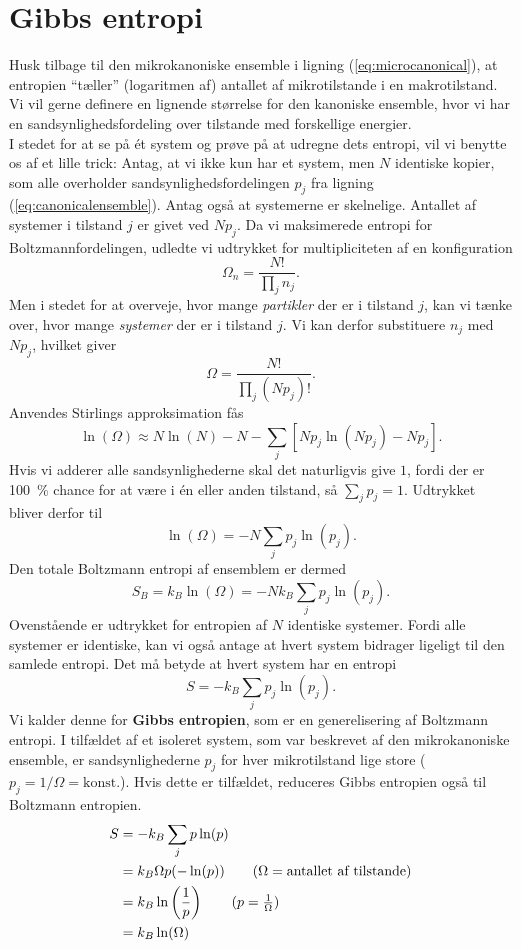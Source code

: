 \section{Gibbs entropi}
Husk tilbage til den mikrokanoniske ensemble i ligning (\ref{eq:microcanonical}), at entropien ``tæller'' (logaritmen af) antallet af mikrotilstande i en makrotilstand. Vi vil gerne definere en lignende størrelse for den kanoniske ensemble, hvor vi har en sandsynlighedsfordeling over tilstande med forskellige energier.\\
\indent I stedet for at se på ét system og prøve på at udregne dets entropi, vil vi benytte os af et lille trick: Antag, at vi ikke kun har et system, men $N$ identiske kopier, som alle overholder sandsynlighedsfordelingen $p_j$ fra ligning (\ref{eq:canonicalensemble}). Antag også at systemerne er skelnelige. Antallet af systemer i tilstand $j$ er givet ved $Np_j$. Da vi maksimerede entropi for Boltzmannfordelingen, udledte vi udtrykket for multipliciteten af en konfiguration
\[ \Omega_n=\frac{N!}{\prod_j n_j}. \]
Men i stedet for at overveje, hvor mange \emph{partikler} der er i tilstand $j$, kan vi tænke over, hvor mange \emph{systemer} der er i tilstand $j$. Vi kan derfor substituere $n_j$ med $Np_j$, hvilket giver
\begin{equation}
	\Omega=\frac{N!}{\prod_j (Np_j)!}.
\end{equation}
Anvendes Stirlings approksimation fås
\[ \ln(\Omega)\approx N\ln (N)-N-\sum_j\left[Np_j\ln(Np_j)-Np_j\right]. \]
Hvis vi adderer alle sandsynlighederne skal det naturligvis give $1$, fordi der er \SI{100}{\percent} chance for at være i én eller anden tilstand, så $\sum_j p_j=1$. Udtrykket bliver derfor til
\[ \ln(\Omega) = -N\sum_j p_j\ln(p_j). \]
Den totale Boltzmann entropi af ensemblem er dermed
\[ S_B=k_B\ln(\Omega)=-Nk_B\sum_j p_j\ln(p_j). \]
Ovenstående er udtrykket for entropien af $N$ identiske systemer. Fordi alle systemer er identiske, kan vi også antage at hvert system bidrager ligeligt til den samlede entropi. Det må betyde at hvert system har en entropi
\begin{equation}
	S=-k_B\sum_j p_j\ln(p_j).
\end{equation}
Vi kalder denne for \textbf{Gibbs entropien}, som er en generelisering af Boltzmann entropi. I tilfældet af et isoleret system, som var beskrevet af den mikrokanoniske ensemble, er sandsynlighederne $p_j$ for hver mikrotilstand lige store ($p_j=1/\Omega=\text{konst.}$). Hvis dette er tilfældet, reduceres Gibbs entropien også til Boltzmann entropien.
\begin{align*}
	S&=-k_B\sum_j p\ln(p)\\
	&=k_B\Omega p(-\ln(p))\tag{$\Omega=\text{antallet af tilstande}$}\\
	&=k_B\ln\left(\frac{1}{p}\right)\tag{$p=\frac{1}{\Omega}$}\\
	&=k_B\ln(\Omega)
\end{align*}
